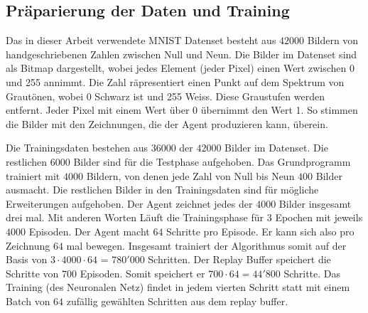 
\subsection*{Präparierung der Daten und Training}
Das in dieser Arbeit verwendete MNIST Datenset besteht aus $42000$ Bildern von
handgeschriebenen Zahlen zwischen Null und Neun. Die Bilder im Datenset sind als
Bitmap dargestellt, wobei jedes Element (jeder Pixel) einen Wert zwischen $0$ und
255 annimmt. Die Zahl räpresentiert einen Punkt auf dem Spektrum von Grautönen,
wobei 0 Schwarz ist und 255 Weiss. Diese Graustufen werden entfernt. Jeder Pixel
mit einem Wert über 0 übernimmt den Wert 1. So stimmen die Bilder mit den
Zeichnungen, die der Agent produzieren kann, überein.

Die Trainingsdaten bestehen aus $36000$ der $42000$ Bilder im Datenset. Die
restlichen $6000$ Bilder sind für die Testphase aufgehoben. Das Grundprogramm
trainiert mit $4000$ Bildern, von denen jede Zahl von Null bis Neun $400$ Bilder
ausmacht. Die restlichen Bilder in den Trainingsdaten sind für mögliche
Erweiterungen aufgehoben. Der Agent zeichnet jedes der $4000$ Bilder insgesamt
drei mal. Mit anderen Worten Läuft die Trainingsphase für $3$ Epochen mit jeweils
$4000$ Episoden. Der Agent macht $64$ Schritte pro Episode. Er kann sich also pro
Zeichnung $64$ mal bewegen. Insgesamt trainiert der Algorithmus somit auf der
Basis von $3\cdot4000\cdot64$ = $780'000$ Schritten. Der Replay Buffer speichert die
Schritte von $700$ Episoden. Somit speichert er $700\cdot64 = 44'800$ Schritte. Das
Training (des Neuronalen Netz) findet in jedem vierten Schritt statt mit einem  %
Batch von $64$ zufällig gewählten Schritten aus dem replay buffer.











